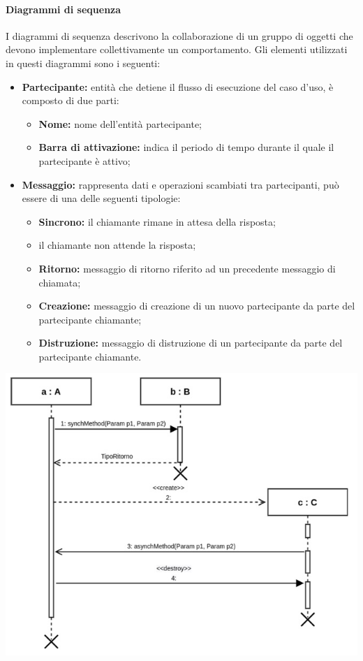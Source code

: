 \paragraph*{Diagrammi di sequenza}
I diagrammi di sequenza descrivono la collaborazione di un gruppo di oggetti che devono implementare collettivamente un comportamento.
Gli elementi utilizzati in questi diagrammi sono i seguenti:
\begin{itemize}
	\item \textbf{Partecipante:} entità che detiene il flusso di esecuzione del caso d'uso, è composto di due parti:
	\begin{itemize}
		\item \textbf{Nome:} nome dell'entità partecipante;
		\item \textbf{Barra di attivazione:} indica il periodo di tempo durante il quale il partecipante è attivo;
	\end{itemize}
	\item \textbf{Messaggio:} rappresenta dati e operazioni scambiati tra partecipanti, può essere di una delle seguenti tipologie:
	\begin{itemize}
		\item \textbf{Sincrono:} il chiamante rimane in attesa della risposta;
		\item {} il chiamante non attende la risposta; 
		\item \textbf{Ritorno:} messaggio di ritorno riferito ad un precedente messaggio di chiamata;
		\item \textbf{Creazione:} messaggio di creazione di un nuovo partecipante da parte del partecipante chiamante;
		\item \textbf{Distruzione:} messaggio di distruzione di un partecipante da parte del partecipante chiamante.
	\end{itemize}
\end{itemize}
\begin{center}
	\includegraphics[scale=0.5]{Immagini/UML/DSequenza} \\
\end{center}

